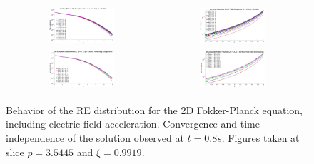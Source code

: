\documentclass[preprint,11pt]{elsarticle}
\begin{document}
\begin{figure}[H]
\begin{tabular}{cc}
\centering
\includegraphics[width=0.46\textwidth]{FIGURES/SG_FG_2DComplete_FGFigs.jpg}
&\includegraphics[width=0.46\textwidth]{FIGURES/SG_FG_2DComplete_vert_FGFigs_lev3lev4lev5.jpg}
\\
\includegraphics[width=0.46\textwidth]{FIGURES/SG_FG_2DComplete_FGFigs_lev3_dt_compare.jpg}
&\includegraphics[width=0.46\textwidth]{FIGURES/SG_FG_2DComplete_vert_FGFigs_lev3_dt_compare.jpg}
\end{tabular}
\caption{Behavior of the RE distribution for the 2D Fokker-Planck equation, including electric field acceleration. Convergence and time-independence of the solution observed at $t = 0.8 s$. Figures taken at slice $p = 3.5445$ and $\xi = 0.9919$.}
\label{fig:2DFP_FG_Complete}
\end{figure}
\end{document}
